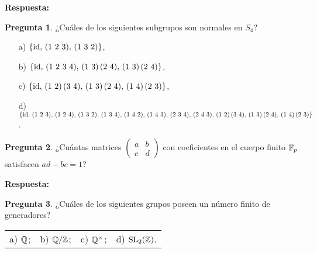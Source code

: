 \documentclass{article}
\theoremstyle{definition}
\newtheorem{pregunta}{Pregunta}
\begin{document}
\noindent\textbf{Respuesta:}

\vspace{3em}

\begin{pregunta}
  ¿Cuáles de los siguientes subgrupos son normales en $S_4$?

  \begin{enumerate}
  \item[a)] $\{ \mathrm{id}, \, (1~2~3), \, (1~3~2) \}$,
  \item[b)] $\{ \mathrm{id}, \, (1~2~3~4), \, (1~3)\,(2~4), \, (1~3)\,(2~4) \}$,
  \item[c)] $\{ \mathrm{id}, \, (1~2)\,(3~4), \, (1~3)\,(2~4), \, (1~4)\,(2~3) \}$,
  \item[d)] $\{ \mathrm{id}, \, (1~2~3), \, (1~2~4), \, (1~3~2), \, (1~3~4), \, (1~4~2), \, (1~4~3), \, (2~3~4), \, (2~4~3), \, (1~2)\,(3~4), \, (1~3)\,(2~4), \, (1~4)\,(2~3) \}$.
  \end{enumerate}
\end{pregunta}

\vspace{3em}

\begin{pregunta}
  ¿Cuántas matrices $\begin{pmatrix} a & b \\ c & d \end{pmatrix}$ con
  coeficientes en el cuerpo finito $\mathbb{F}_p$ satisfacen $ad - bc = 1$?
\end{pregunta}

\noindent\textbf{Respuesta:}

\vspace{3em}

\begin{pregunta}
  ¿Cuáles de los siguientes grupos poseen un número finito de generadores?

  \begin{center}
    \begin{tabular}{x{3cm}x{3cm}x{3cm}x{3cm}}
      a) $\mathbb{Q}$; & b) $\mathbb{Q}/\mathbb{Z}$; & c) $\mathbb{Q}^\times$; & d) $\operatorname{SL}_2 (\mathbb{Z})$.
    \end{tabular}
  \end{center}
\end{pregunta}

\vspace{3em}
\end{document}
